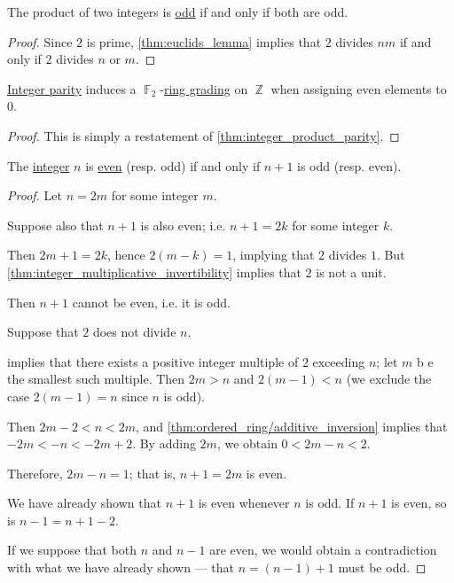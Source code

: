 \begin{proposition}\label{thm:integer_product_parity}
  The product of two integers is \hyperref[def:integer_parity]{odd} if and only if both are odd.
\end{proposition}
\begin{proof}
  Since \( 2 \) is prime, \cref{thm:euclids_lemma} implies that \( 2 \) divides \( nm \) if and only if \( 2 \) divides \( n \) or \( m \).
\end{proof}

\begin{corollary}\label{thm:integer_parity_grading}
  \hyperref[def:integer_parity]{Integer parity} induces a \( \BbbF_2 \)-\hyperref[def:graded_ring]{ring grading} on \( \BbbZ \) when assigning even elements to \( 0 \).
\end{corollary}
\begin{proof}
  This is simply a restatement of \cref{thm:integer_product_parity}.
\end{proof}

\begin{lemma}\label{thm:integer_successor_parity}
  The \hyperref[def:integers]{integer} \( n \) is \hyperref[def:integer_parity]{even} (resp. odd) if and only if \( n + 1 \) is odd (resp. even).
\end{lemma}
\begin{proof}
  \SufficiencySubProof
   Let \( n = 2m \) for some integer \( m \).

  Suppose also that \( n + 1 \) is also even; i.e. \( n + 1 = 2k \) for some integer \( k \).

  Then \( 2m + 1 = 2k \), hence \( 2(m - k) = 1 \), implying that \( 2 \) divides \( 1 \). But \cref{thm:integer_multiplicative_invertibility} implies that \( 2 \) is not a unit.

  Then \( n + 1 \) cannot be even, i.e. it is odd.

   Suppose that \( 2 \) does not divide \( n \).

   implies that there exists a positive integer multiple of \( 2 \) exceeding \( n \); let \( m \) b
  e the smallest such multiple. Then \( 2m > n \) and \( 2(m - 1) < n \) (we exclude the case \( 2(m - 1) = n \) since \( n \) is odd).

  Then \( 2m - 2 < n < 2m \), and \cref{thm:ordered_ring/additive_inversion} implies that \( -2m < -n < -2m + 2 \). By adding \( 2m \), we obtain \( 0 < 2m - n < 2 \).

  Therefore, \( 2m - n = 1 \); that is, \( n + 1 = 2m \) is even.

  \NecessitySubProof
   We have already shown that \( n + 1 \) is even whenever \( n \) is odd. If \( n + 1 \) is even, so is \( n - 1 = n + 1 - 2 \).

   If we suppose that both \( n \) and \( n - 1 \) are even, we would obtain a contradiction with what we have already shown --- that \( n = (n - 1) + 1 \) must be odd.
\end{proof}

